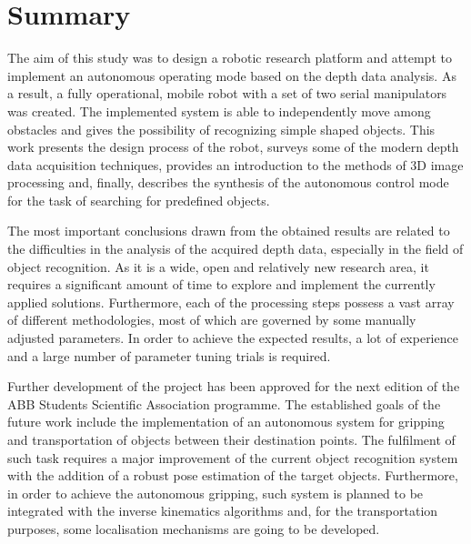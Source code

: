 \chapter*{Summary}
\label{cha:summary}

The aim of this study was to design a robotic research platform and attempt to implement an autonomous operating mode based on the depth data analysis. As a result, a fully operational, mobile robot with a set of two serial manipulators was created. The implemented system is able to independently move among obstacles and gives the possibility of recognizing simple shaped objects. This work presents the design process of the robot, surveys some of the modern depth data acquisition techniques, provides an introduction to the methods of 3D image processing and, finally, describes the synthesis of the autonomous control mode for the task of searching for predefined objects. 

The most important conclusions drawn from the obtained results are related to the difficulties in the analysis of the acquired depth data, especially in the field of object recognition. As it is a wide, open and relatively new research area, it requires a significant amount of time to explore and implement the currently applied solutions. Furthermore, each of the processing steps possess a vast array of different methodologies, most of which are governed by some manually adjusted parameters. In order to achieve the expected results, a lot of experience and a large number of parameter tuning trials is required.

Further development of the project has been approved for the next edition of the ABB Students Scientific Association programme. The established goals of the future work include the implementation of an autonomous system for gripping and transportation of objects between their destination points. The fulfilment of such task requires a major improvement of the current object recognition system with the addition of a robust pose estimation of the target objects. Furthermore, in order to achieve the autonomous gripping, such system is planned to be integrated with the inverse kinematics algorithms and,  for the transportation purposes, some localisation mechanisms are going to be developed.